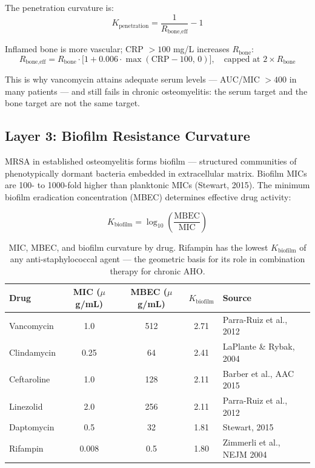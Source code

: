\documentclass[11pt]{article}
\begin{document}
The penetration curvature is:
\[
  K_{\text{penetration}} = \frac{1}{R_{\text{bone,eff}}} - 1
\]

Inflamed bone is more vascular; CRP $> 100$ mg/L increases $R_{\text{bone}}$:
\[
  R_{\text{bone,eff}} = R_{\text{bone}} \cdot
    \bigl[1 + 0.006 \cdot \max(\text{CRP} - 100,\, 0)\bigr], \quad
    \text{capped at } 2 \times R_{\text{bone}}
\]

This is why vancomycin attains adequate serum levels — AUC/MIC $>400$ in many
patients — and still fails in chronic osteomyelitis: the serum target and the
bone target are not the same target.

\subsection{Layer 3: Biofilm Resistance Curvature}

MRSA in established osteomyelitis forms biofilm — structured communities of
phenotypically dormant bacteria embedded in extracellular matrix. Biofilm MICs
are 100- to 1000-fold higher than planktonic MICs (Stewart, 2015). The minimum
biofilm eradication concentration (MBEC) determines effective drug activity:

\[
  K_{\text{biofilm}} = \log_{10}\!\left(\frac{\text{MBEC}}{\text{MIC}}\right)
\]

\begin{table}[h!]
\centering
\small
\begin{tabular}{lcccl}
\toprule
\textbf{Drug} & \textbf{MIC ($\mu$g/mL)} & \textbf{MBEC ($\mu$g/mL)} & \textbf{$K_{\text{biofilm}}$} & \textbf{Source} \\
\midrule
Vancomycin   & 1.0   & 512  & 2.71 & Parra-Ruiz et al., 2012 \\
Clindamycin  & 0.25  & 64   & 2.41 & LaPlante \& Rybak, 2004 \\
Ceftaroline  & 1.0   & 128  & 2.11 & Barber et al., AAC 2015 \\
Linezolid    & 2.0   & 256  & 2.11 & Parra-Ruiz et al., 2012 \\
Daptomycin   & 0.5   & 32   & 1.81 & Stewart, 2015 \\
Rifampin     & 0.008 & 0.5  & 1.80 & Zimmerli et al., NEJM 2004 \\
\bottomrule
\end{tabular}
\caption{MIC, MBEC, and biofilm curvature by drug. Rifampin has the lowest
$K_{\text{biofilm}}$ of any anti-staphylococcal agent — the geometric basis
for its role in combination therapy for chronic AHO.}
\end{table}
\end{document}
